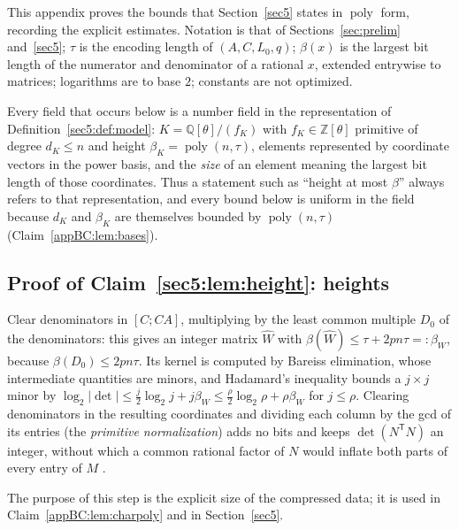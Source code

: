 \documentclass[journal]{IEEEtran}
\theoremstyle{plainn}
\theoremstyle{remark}
\newcommand{\poly}{\operatorname{poly}}
\begin{document}
This appendix proves the bounds that Section~\ref{sec5} states in $\poly$ form, recording the explicit
estimates. Notation is that of Sections~\ref{sec:prelim} and~\ref{sec5}; $\tau$ is the encoding length
of $(A,C,L_0,q)$; $\beta(x)$ is the largest bit length of the numerator and denominator of a rational
$x$, extended entrywise to matrices; logarithms are to base $2$; constants are not optimized.

Every field that occurs below is a number field in the representation of
Definition~\ref{sec5:def:model}: $K=\mathbb{Q}[\theta]/(f_K)$ with $f_K\in\mathbb{Z}[\theta]$
primitive of degree $d_K\le n$ and height $\beta_K=\poly(n,\tau)$, elements represented by coordinate
vectors in the power basis, and the \emph{size} of an element meaning the largest bit length of those
coordinates. Thus a statement such as ``height at most $\beta$'' always refers to that representation,
and every bound below is uniform in the field because $d_K$ and $\beta_K$ are themselves bounded by
$\poly(n,\tau)$ (Claim~\ref{appBC:lem:bases}).


\subsection{Proof of Claim~\ref{sec5:lem:height}: heights}\label{appBC:sub:norm}


Clear denominators in $[C;CA]$, multiplying by the least common multiple $D_0$ of the denominators:
this gives an integer matrix $\widehat W$ with $\beta(\widehat W)\le\tau+2pn\tau=:\beta_W$, because
$\beta(D_0)\le2pn\tau$. Its kernel is computed by Bareiss elimination, whose intermediate quantities
are minors, and Hadamard's inequality bounds a $j\times j$ minor by
$\log_2|\det|\le\frac{j}{2}\log_2 j+j\beta_W\le\frac{\rho}{2}\log_2\rho+\rho\beta_W$ for
$j\le\rho$. Clearing denominators in the resulting coordinates and dividing each column by the gcd of
its entries (the \emph{primitive normalization}) adds no bits and keeps $\det(N^{\mathsf T}N)$ an
integer, without which a common rational factor of $N$ would inflate both parts of every entry of $M$
\cite{hj13,vzgg03}.


The purpose of this step is the explicit size of the compressed data; it is used in
Claim~\ref{appBC:lem:charpoly} and in Section~\ref{sec5}.
\end{document}
